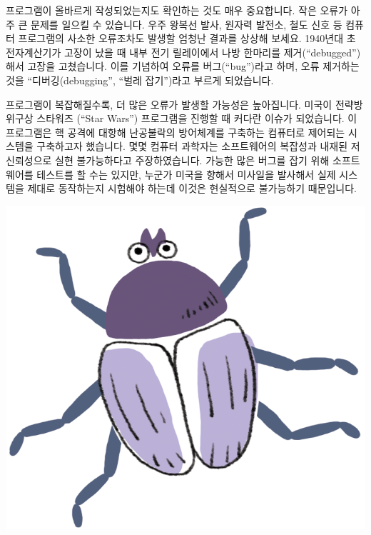 \documentclass[]{article}
\begin{document}
프로그램이 올바르게 작성되었는지도 확인하는 것도 매우 중요합니다. 작은
오류가 아주 큰 문제를 일으킬 수 있습니다. 우주 왕복선 발사, 원자력
발전소, 철도 신호 등 컴퓨터 프로그램의 사소한 오류조차도 발생할 엄청난
결과를 상상해 보세요. 1940년대 초 전자계산기가 고장이 났을 때 내부 전기
릴레이에서 나방 한마리를 제거(``debugged'')해서 고장을 고쳤습니다. 이를
기념하여 오류를 버그(``bug'')라고 하며, 오류 제거하는 것을
``디버깅(debugging'', ``벌레 잡기'')라고 부르게 되었습니다.

프로그램이 복잡해질수록, 더 많은 오류가 발생할 가능성은 높아집니다.
미국이 전략방위구상 스타워즈 (``Star Wars'') 프로그램을 진행할 때 커다란
이슈가 되었습니다. 이 프로그램은 핵 공격에 대항해 난공불락의 방어체계를
구축하는 컴퓨터로 제어되는 시스템을 구축하고자 했습니다. 몇몇 컴퓨터
과학자는 소프트웨어의 복잡성과 내재된 저신뢰성으로 실현 불가능하다고
주장하였습니다. 가능한 많은 버그를 잡기 위해 소프트웨어를 테스트를 할
수는 있지만, 누군가 미국을 향해서 미사일을 발사해서 실제 시스템을 제대로
동작하는지 시험해야 하는데 이것은 현실적으로 불가능하기 때문입니다.

\includegraphics{csunplugged/03-part/img/ch13-language/12-language-03-bug.png}

\end{document}
